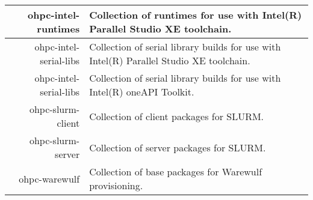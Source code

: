 \begin{tabularx}{\textwidth}{r|X}
\hline
ohpc-intel-runtimes & Collection of runtimes for use with Intel(R) Parallel Studio XE toolchain. \\ 
\hline
ohpc-intel-serial-libs & Collection of serial library builds for use with Intel(R) Parallel Studio XE toolchain. \\ 
\hline
ohpc-intel-serial-libs & Collection of serial library builds for use with Intel(R) oneAPI Toolkit. \\ 
\hline
ohpc-slurm-client & Collection of client packages for SLURM. \\ 
\hline
ohpc-slurm-server & Collection of server packages for SLURM. \\ 
\hline
ohpc-warewulf & Collection of base packages for Warewulf provisioning. \\ 
\hline
\bottomrule
\end{tabularx}
